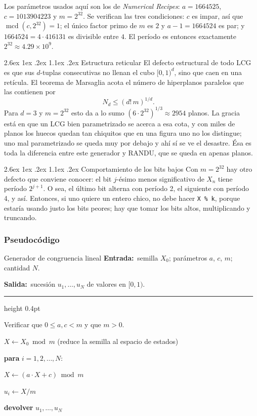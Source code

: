 \documentclass[11pt,letterpaper]{article}
\makeatletter
\renewcommand\paragraph{\@startsection{paragraph}{4}{\z@}%
  {2.6ex \@plus 1ex \@minus .2ex}%
  {1.1ex \@plus .2ex}%
  {\normalfont\normalsize\bfseries}}
\newcommand{\code}[1]{\texttt{#1}}
\DeclareMathOperator{\mcd}{mcd}
\newcommand{\entrada}[1]{\textbf{\small Entrada:}\ \small #1\par}
\newcommand{\salida}[1]{\textbf{\small Salida:}\ \small #1\par
  \vspace{3pt}\textcolor{marco}{\hrule height 0.4pt}\vspace{5pt}}
\makeatother
\begin{document}
Los parámetros usados aquí son los de \emph{Numerical Recipes}:
$a = 1664525$, $c = 1013904223$ y $m = 2^{32}$. Se verifican las tres
condiciones: $c$ es impar, así que $\mcd(c,2^{32}) = 1$; el único factor
primo de $m$ es $2$ y $a-1 = 1664524$ es par; y
$1664524 = 4 \cdot 416131$ es divisible entre $4$. El período es entonces
exactamente $2^{32} \approx 4.29\times 10^9$.

\paragraph{Estructura reticular} El defecto estructural de todo LCG es que
sus $d$-tuplas consecutivas no llenan el cubo $[0,1)^d$, sino que caen en una
retícula. El teorema de Marsaglia acota el número de hiperplanos paralelos
que las contienen por
\begin{equation}
N_d \le (d!\,m)^{1/d}.
\label{eq:marsaglia}
\end{equation}
Para $d=3$ y $m=2^{32}$ esto da a lo sumo $(6 \cdot 2^{32})^{1/3} \approx
2954$ planos. La gracia está en que un LCG bien parametrizado se acerca a esa
cota, y con miles de planos los huecos quedan tan chiquitos que en una figura
uno no los distingue; uno mal parametrizado se queda muy por debajo y ahí sí
se ve el desastre. Ésa es toda la diferencia entre este generador y RANDU,
que se queda en apenas \PlanosRandu{} planos.

\paragraph{Comportamiento de los bits bajos} Con $m = 2^{32}$ hay otro
defecto que conviene conocer: el bit $j$-ésimo menos significativo de $X_n$
tiene período $2^{j+1}$. O sea, el último bit alterna con período 2, el
siguiente con período 4, y así. Entonces, si uno quiere un entero chico, no
debe hacer \code{X \% k}, porque estaría usando justo los bits peores; hay
que tomar los bits altos, multiplicando y truncando.

\subsubsection{Pseudocódigo}

\begin{pseudo}{Generador de congruencia lineal}
\entrada{semilla $X_0$; parámetros $a$, $c$, $m$; cantidad $N$.}
\salida{sucesión $u_1,\dots,u_N$ de valores en $[0,1)$.}
\begin{pasos}
  \item Verificar que $0 \le a, c < m$ y que $m > 0$.
  \item $X \gets X_0 \bmod m$ \quad \textcolor{gris}{\small(reduce la semilla al espacio de estados)}
  \item \textbf{para} $i = 1, 2, \dots, N$:
  \begin{pasos}
     \item $X \gets (a \cdot X + c) \bmod m$
     \item $u_i \gets X / m$
  \end{pasos}
  \item \textbf{devolver} $u_1, \dots, u_N$
\end{pasos}
\end{pseudo}
\end{document}
